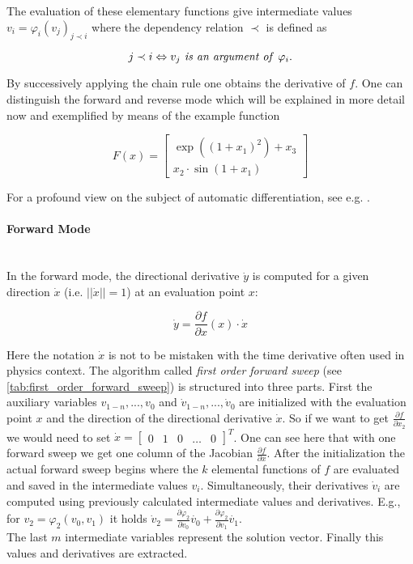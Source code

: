 \documentclass{scrartcl}[12pt, halfparskip]
\numberwithin{equation}{section}
\numberwithin{figure}{section}
\numberwithin{table}{section}
\begin{document}
The evaluation of these elementary functions give intermediate values $v_i = \varphi_i(v_j)_{j \prec i}$ where the dependency relation $\prec$ is defined as

\begin{equation}
j \prec i \Leftrightarrow v_j \text{\textit{ is an argument of }} \varphi_i.
\end{equation}

By successively applying the chain rule one obtains the derivative of $f$.
One can distinguish the forward and reverse mode which will be explained in more detail now and exemplified by means of the example function

\begin{equation}
F(x) = 
\begin{bmatrix}
\exp((1+x_1)^2) + x_3 \\
x_2 \cdot \sin(1+x_1)
\end{bmatrix}
\label{eq:AD_example}
\end{equation}

For a profound view on the subject of automatic differentiation, see e.g. \cite{eval_derivatives_walther_griewank}.


\paragraph{Forward Mode}\mbox{}\\
In the forward mode, the directional derivative $\dot{y}$ is computed for a given direction $\dot{x}$ (i.e. $|| \dot{x} || = 1$) at an evaluation point $x$:

\begin{equation}
\dot{y} = \frac{\partial f}{\partial x}(x) \cdot \dot{x}
\end{equation}

Here the notation $\dot{x}$ is not to be mistaken with the time derivative often used in physics context.
The algorithm called \textit{first order forward sweep} (see \cref{tab:first_order_forward_sweep}) is structured into three parts. First the auxiliary variables $v_{1-n},...,v_0$ and $\dot{v}_{1-n},...,\dot{v}_0$ are initialized with the evaluation point $x$ and the direction of the directional derivative $\dot{x}$. So if we want to get $\frac{\partial f}{\partial x_2}$ we would need to set $\dot{x} = \begin{bmatrix}
0 & 1 & 0 & \dots & 0
\end{bmatrix}^T$. One can see here that with one forward sweep we get one column of the Jacobian $ \frac{\partial f}{\partial x}$. 
After the initialization the actual forward sweep begins where the $k$ elemental functions of $f$ are evaluated and saved in the intermediate values $v_i$. Simultaneously, their derivatives  $\dot{v}_i$ are computed using previously calculated intermediate values and derivatives. E.g., for $v_2 = \varphi_2(v_0, v_1)$ it holds $\dot{v}_2 = \frac{\partial \varphi_2}{\partial v_0} \dot{v_0} + \frac{\partial \varphi_2}{\partial v_1} \dot{v_1}$. \\
The last $m$ intermediate variables represent the solution vector. Finally this values and derivatives are extracted.
\end{document}
